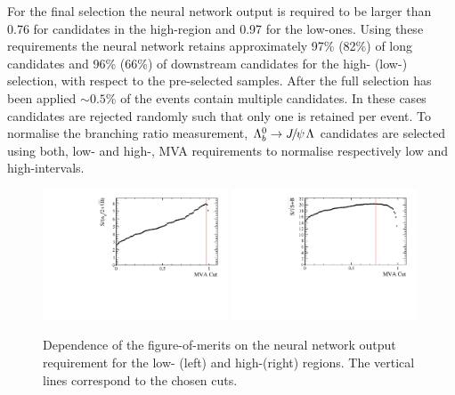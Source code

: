 For the final selection the neural network output is required to be larger than 0.76 for candidates in the high-\qsq region
and 0.97 for the low-\qsq ones. Using these requirements the neural network retains approximately 97\% (82\%) of long 
candidates and 96\% (66\%) of downstream candidates for the high- (low-) \qsq selection, with respect to
the pre-selected samples. After the full selection has been applied $\sim 0.5$\% of the events contain multiple candidates.
In these cases candidates are rejected randomly such that only one is retained per event. 
%
%
To normalise the branching ratio measurement, $\Lb\to\jpsi\Lz$ candidates are selected using both, low- and high-\qsq, 
MVA requirements to normalise respectively low and high-\qsq intervals. 
%
\begin{figure}
\centering
\includegraphics[width=0.49\textwidth]{Lmumu/figs/Lmumu_lowQ2_FoM.pdf}
\includegraphics[width=0.49\textwidth]{Lmumu/figs/Lmumu_highQ2_FoM.pdf}
\caption{Dependence of the figure-of-merits on the neural network output requirement for the low-\qsq
(left) and high-\qsq (right) regions. The vertical lines correspond to the chosen cuts.}
\label{fig:Lb_FOM}
\end{figure}
%
